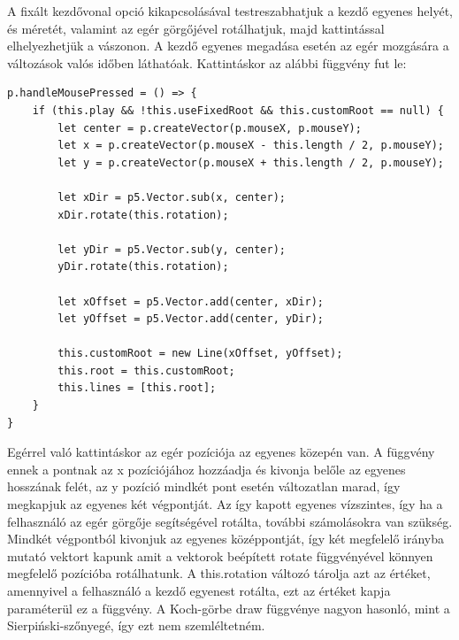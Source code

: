 A fixált kezdővonal opció kikapcsolásával testreszabhatjuk a kezdő egyenes helyét, és méretét, valamint az egér görgőjével rotálhatjuk, majd kattintással elhelyezhetjük a vászonon. A kezdő egyenes megadása esetén az egér mozgására a változások valós időben láthatóak. Kattintáskor az alábbi függvény fut le:
\begin{lstlisting}
p.handleMousePressed = () => {
	if (this.play && !this.useFixedRoot && this.customRoot == null) {
		let center = p.createVector(p.mouseX, p.mouseY);
		let x = p.createVector(p.mouseX - this.length / 2, p.mouseY);
		let y = p.createVector(p.mouseX + this.length / 2, p.mouseY);
		
		let xDir = p5.Vector.sub(x, center);
		xDir.rotate(this.rotation);
		
		let yDir = p5.Vector.sub(y, center);
		yDir.rotate(this.rotation);
		
		let xOffset = p5.Vector.add(center, xDir);
		let yOffset = p5.Vector.add(center, yDir);
		
		this.customRoot = new Line(xOffset, yOffset);
		this.root = this.customRoot;
		this.lines = [this.root];
	}
}
\end{lstlisting}
Egérrel való kattintáskor az egér pozíciója az egyenes közepén van. A függvény ennek a pontnak az x pozíciójához hozzáadja és kivonja belőle az egyenes hosszának felét, az y pozíció mindkét pont esetén változatlan marad, így megkapjuk az egyenes két végpontját. Az így kapott egyenes vízszintes, így ha a felhasználó az egér görgője segítségével rotálta, további számolásokra van szükség. Mindkét végpontból kivonjuk az egyenes középpontját, így két megfelelő irányba mutató vektort kapunk amit a vektorok beépített rotate függvényével könnyen megfelelő pozícióba rotálhatunk. A this.rotation változó tárolja azt az értéket, amennyivel a felhasználó a kezdő egyenest rotálta, ezt az értéket kapja paraméterül ez a függvény. A Koch-görbe draw függvénye nagyon hasonló, mint a Sierpiński-szőnyegé, így ezt nem szemléltetném.
